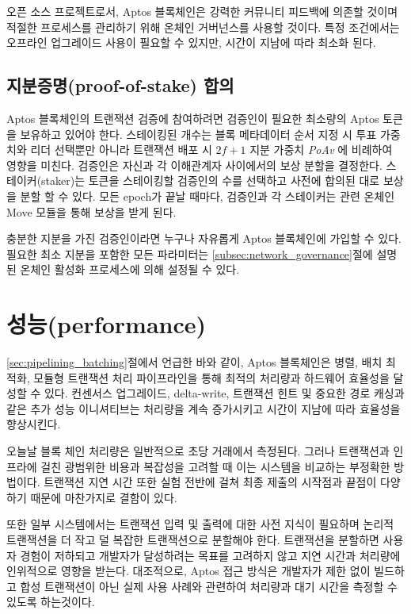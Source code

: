 \documentclass{article}
\begin{document}
오픈 소스 프로젝트로서, Aptos 블록체인은 강력한 커뮤니티 피드백에 의존할 것이며 적절한 프로세스를 관리하기 위해 온체인 거버넌스를 사용할 것이다. 특정 조건에서는 오프라인 업그레이드 사용이 필요할 수 있지만, 시간이 지남에 따라 최소화 된다.

\subsection{지분증명(proof-of-stake) 합의}

Aptos 블록체인의 트랜잭션 검증에 참여하려면 검증인이 필요한 최소량의 Aptos 토큰을 보유하고 있어야 한다. 스테이킹된 개수는 블록 메타데이터 순서 지정 시 투표 가중치와 리더 선택뿐만 아니라 트랜잭션 배포 시 $2f + 1$ 지분 가중치 \emph{PoAv} 에 비례하여 영향을 미친다. 검증인은 자신과 각 이해관계자 사이에서의 보상 분할을 결정한다. 스테이커(staker)는 토큰을 스테이킹할 검증인의 수를 선택하고 사전에 합의된 대로 보상을 분할 할 수 있다. 모든 epoch가 끝날 때마다, 검증인과 각 스테이커는 관련 온체인 Move 모듈을 통해 보상을 받게 된다.

충분한 지분을 가진 검증인이라면 누구나 자유롭게 Aptos 블록체인에 가입할 수 있다. 필요한 최소 지분을 포함한 모든 파라미터는 \ref{subsec:network_governance}절에 설명된 온체인 활성화 프로세스에 의해 설정될 수 있다.

\section{성능(performance)}
\label{sec:performance}

\ref{sec:pipelining_batching}절에서 언급한 바와 같이, Aptos 블록체인은 병렬, 배치 최적화, 모듈형 트랜잭션 처리 파이프라인을 통해 최적의 처리량과 하드웨어 효율성을 달성할 수 있다. 컨센서스 업그레이드, delta-write, 트랜잭션 힌트 및 중요한 경로 캐싱과 같은 추가 성능 이니셔티브는 처리량을 계속 증가시키고 시간이 지남에 따라 효율성을 향상시킨다.

오늘날 블록 체인 처리량은 일반적으로 초당 거래에서 측정된다. 그러나 트랜잭션과 인프라에 걸친 광범위한 비용과 복잡성을 고려할 때 이는 시스템을 비교하는 부정확한 방법이다. 트랜잭션 지연 시간 또한 실험 전반에 걸쳐 최종 제출의 시작점과 끝점이 다양하기 때문에 마찬가지로 결함이 있다.

또한 일부 시스템에서는 트랜잭션 입력 및 출력에 대한 사전 지식이 필요하며 논리적 트랜잭션을 더 작고 덜 복잡한 트랜잭션으로 분할해야 한다. 트랜잭션을 분할하면 사용자 경험이 저하되고 개발자가 달성하려는 목표를 고려하지 않고 지연 시간과 처리량에 인위적으로 영향을 받는다. 대조적으로, Aptos 접근 방식은 개발자가 제한 없이 빌드하고 합성 트랜잭션이 아닌 실제 사용 사례와 관련하여 처리량과 대기 시간을 측정할 수 있도록 하는것이다.
\end{document}
